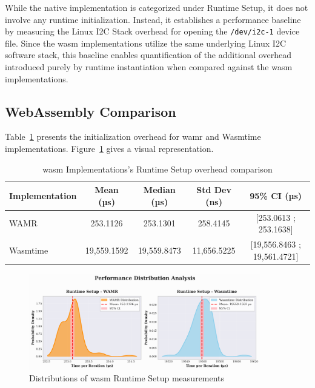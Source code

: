 While the native implementation is categorized under Runtime Setup, it does not involve any runtime initialization. Instead, it establishes a performance baseline by measuring the Linux I2C Stack overhead for opening the \texttt{/dev/i2c-1} device file. Since the \acrshort{wasm} implementations utilize the same underlying Linux I2C software stack, this baseline enables quantification of the additional overhead introduced purely by runtime instantiation when compared against the \acrshort{wasm} implementations.

\subsection{WebAssembly Comparison}
\label{subsec:eval-setup-wasm}

Table~\ref{tab:wasm-setup} presents the initialization overhead for \acrshort{wamr} and Wasmtime implementations. Figure~\ref{fig:wasm-setup-distribution} gives a visual representation.

\begin{table}[h]
    \centering
    \caption{\acrshort{wasm} Implementations's Runtime Setup overhead comparison}
    \label{tab:wasm-setup}
    \begin{tabular}{lcccc}
        \toprule
        \textbf{Implementation} & \textbf{Mean (µs)} & \textbf{Median (µs)} & \textbf{Std Dev (ns)} & \textbf{95\% CI (µs)} \\
        \midrule
        WAMR        & 253.1126 & 253.1301 & 258.4145 & [253.0613 ; 253.1638] \\
        Wasmtime    & 19,559.1592 & 19,559.8473 & 11,656.5225 & [19,556.8463 ; 19,561.4721] \\
        \bottomrule
    \end{tabular}
\end{table}

\begin{figure}[h]
    \centering
    \includegraphics[width=0.9\textwidth]{images/wasm-setup-distribution}
    \caption{Distributions of \acrshort{wasm} Runtime Setup measurements}
    \label{fig:wasm-setup-distribution}
\end{figure}

